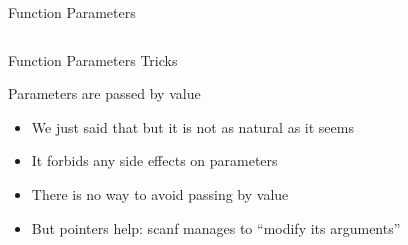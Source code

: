 \begin{Coupe}
\begin{frame}{Function Parameters}
\begin{columns}
\begin{column}{.3\linewidth}
    \end{column}
  \end{columns}
\end{frame}
\begin{frame}{Function Parameters Tricks}  
  \begin{block}{Parameters are passed by value}
    \begin{itemize}
    \item We just said that but it is not as natural as it seems
    \item It forbids any side effects on parameters
    \item<7> There is no way to avoid passing by value
    \item<7> But pointers help: scanf manages to ``modify its arguments''
    \end{itemize}
  \end{block}  

  \begin{columns}
    \begin{column}{.35\linewidth}
    \end{column}
    \begin{column}{.25\linewidth}
\end{column}
\end{columns}
\end{frame}
\end{Coupe}
